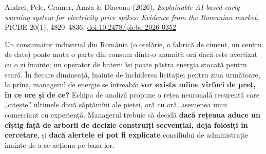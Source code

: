 
\renewcommand{\emqacase}{\T{Research case 2 (Lectures 5 and 11)}{Studiul de caz 2 (cursurile 5 și 11)}}

%
          { Andrei, Pele, Cramer, Amza \& Diaconu (2026), \emph{Explainable AI-based early warning system for electricity price spikes: Evidence from the Romanian market},
           PICBE 20(1), 4820--4836, \href{https://doi.org/10.2478/picbe-2026-0352}{doi:10.2478/picbe-2026-0352}}

\begin{scenario}
%
{Un consumator industrial din România (o oțelărie, o fabrică de ciment, un centru de date) poate muta o parte din consum dintr-o anumită oră dacă este avertizat cu o zi înainte; un operator de baterii își poate păstra energia stocată pentru seară.
În fiecare dimineață, înainte de închiderea licitației pentru ziua următoare, la prînz, managerul de energie se întreabă: \textbf{vor exista mîine vîrfuri de preț, în ce ore și de ce?}
Echipa de analiză propune o rețea neuronală recurentă care „citește” ultimele două săptămîni ale pieței, oră cu oră, asemenea unui comerciant cu experiență. Managerul trebuie să decidă \textbf{dacă rețeaua aduce un cîștig față de arborii de decizie construiți secvențial, deja folosiți în cercetare}, și \textbf{dacă alertele ei pot fi explicate} consiliului de administrație înainte de a se acționa pe baza lor.}
\end{scenario}

